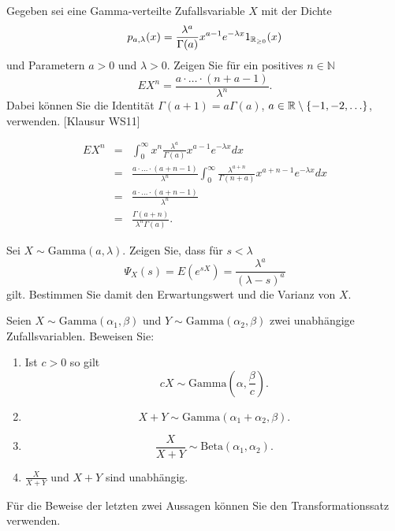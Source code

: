 Gegeben sei eine Gamma-verteilte Zufallsvariable $X$ mit der Dichte
\begin{equation*}
    p_{a,\lambda}(x) = \frac{\lambda^a}{\Gamma(a)}x^{a-1}e^{-\lambda x} 1_{\mathbb{R}_{\geq 0}}(x)
\end{equation*}
und Parametern $a>0$ und $\lambda>0$.
Zeigen Sie für ein positives $n\in\mathbb N$
\begin{equation*}
    E X^n = \frac{a\cdot\ldots\cdot (n+a-1)}{\lambda^n}.
\end{equation*}
Dabei können Sie die Identität 
$\Gamma(a+1)=a \Gamma(a)$, $a\in\mathbb{R} \setminus \left\{ -1,-2,\ldots \right\}$, verwenden.
[Klausur WS11]

\solution
\begin{eqnarray*}
    E X^n &=& \int_{0}^{\infty} x^n \frac{\lambda^a}{\Gamma(a)}x^{a-1}e^{-\lambda x} dx \\
    &=& \frac{a \cdot\ldots\cdot \left( a+n-1 \right)}{\lambda^n} 
    \int_{0}^{\infty} \frac{\lambda^{a+n}}{\Gamma(n+a)} x^{a+n-1} e^{-\lambda x} dx \\
    &=& \frac{a\cdot \ldots \cdot \left( a+n-1 \right)}{\lambda^n} \\
    &=& \frac{\Gamma\left( a+n \right)}{ \lambda^n \Gamma\left( a \right)}.
\end{eqnarray*}


Sei $X \sim \textrm{Gamma}(a, \lambda)$. Zeigen Sie, dass für $s<\lambda$
\begin{equation*}
    \Psi_X(s) = E \left( e^{sX} \right) = \frac{\lambda^a}{ (\lambda-s)^a}
\end{equation*}
gilt. Bestimmen Sie damit den Erwartungswert und die Varianz von $X$. %

 Seien $X \sim
\textrm{Gamma}(\alpha_1, \beta)$ und $Y \sim \textrm{Gamma}(\alpha_2, \beta)$
zwei unabhängige Zufallsvariablen. Beweisen Sie:
\begin{enumerate}
    \item Ist $c>0$ so gilt
        \begin{equation*}
            c X \sim \text{Gamma}(\alpha, \frac{\beta}{c}).
        \end{equation*}
    \item \begin{equation*}
            X + Y \sim \text{Gamma}(\alpha_1 + \alpha_2, \beta).
        \end{equation*}
    \item \begin{equation*}
            \frac{X}{X+Y} \sim \text{Beta}(\alpha_1, \alpha_2).
        \end{equation*}
    \item $\frac{X}{X+Y}$ und $X+Y$ sind unabhängig. 
\end{enumerate}
Für die Beweise der letzten zwei Aussagen können Sie den Transformationssatz
verwenden. 

